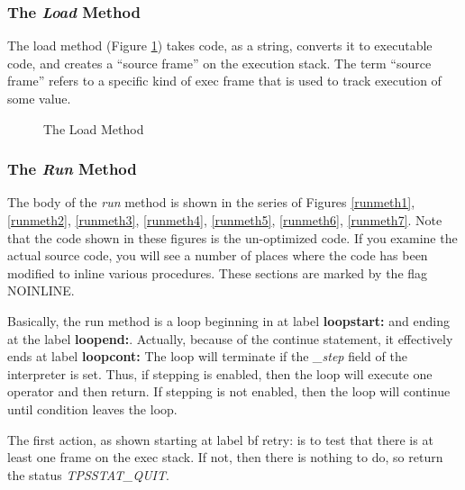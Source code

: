 \subsubsection{The {\em Load} Method}
The load method (Figure \ref{loadmeth}) takes code, as a string,
converts it to executable code,
and creates a ``source frame'' on the execution stack.
The term ``source frame'' refers to a specific kind of exec frame
that is used to track execution of some value.
\begin{figure}[b]\centering
\horizontalline

\caption{The Load Method}
\label{loadmeth}
\end{figure}


\clearpage

\subsubsection{The {\em Run} Method}
The body of the {\em run} method is shown in the series
of Figures
\ref{runmeth1},
\ref{runmeth2},
\ref{runmeth3},
\ref{runmeth4},
\ref{runmeth5},
\ref{runmeth6},
\ref{runmeth7}.
Note that the code shown in these figures is the un-optimized
code.  If you examine the actual source code, you will
see a number of places where the code has been modified
to inline various procedures.  These sections
are marked by the flag NOINLINE.

Basically, the run method is a loop
beginning in at label {\bf loopstart:}
and ending at the label {\bf loopend:}.
Actually, because of the continue statement, it effectively
ends at label {\bf loopcont:}
The loop will terminate if the {\em \_step} field of the interpreter
is set.  Thus, if stepping is enabled, then the loop will
execute one operator and then return.  If stepping is not enabled,
then the loop will continue until condition leaves the loop.

The first action, as shown starting at label {bf retry:}
is to test that there is at least one frame on the exec stack.
If not, then there is nothing to do, so return the status {\em TPSSTAT\_QUIT}.

